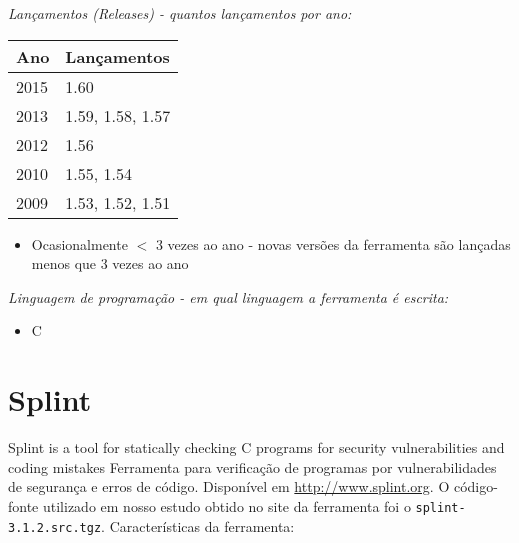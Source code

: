 \begin{description}

  \item {\it Lançamentos ({\it Releases}) - quantos lançamentos por ano:}
    \begin{table}[h!]
      \centering
      \begin{tabular}{| l | l |}
        \hline
        Ano  & Lançamentos      \\
        \hline
        2015 & 1.60             \\
        2013 & 1.59, 1.58, 1.57 \\
        2012 & 1.56             \\
        2010 & 1.55, 1.54       \\
        2009 & 1.53, 1.52, 1.51 \\
        \hline
      \end{tabular}
    \end{table}
    \begin{itemize}
      \item Ocasionalmente $<$ 3 vezes ao ano - novas versões da ferramenta são lançadas menos que 3 vezes ao ano
    \end{itemize}

  \item {\it Linguagem de programação - em qual linguagem a ferramenta é escrita:}
    \begin{itemize}
      \item C
    \end{itemize}

\end{description}

\section{Splint}

Splint is a tool for statically checking C programs for security
vulnerabilities and coding mistakes Ferramenta para verificação de programas
por vulnerabilidades de segurança e erros de código. Disponível em
\url{http://www.splint.org}. O código-fonte utilizado em nosso estudo obtido
no site da ferramenta foi o \texttt{splint-3.1.2.src.tgz}. Características da
ferramenta:

